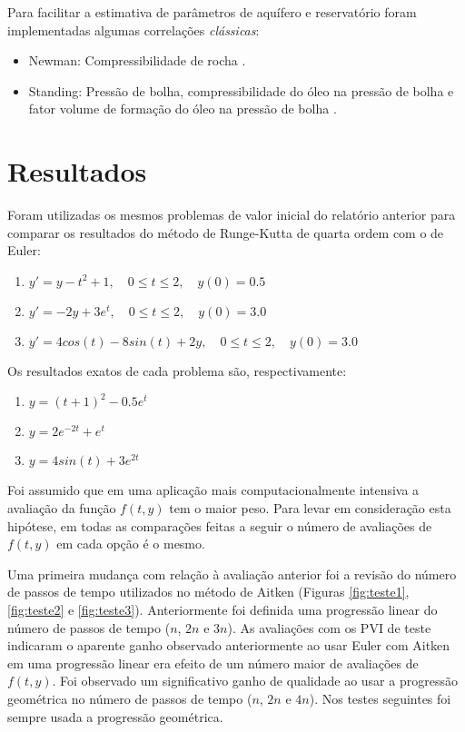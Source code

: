 \documentclass[final,5p]{elsarticle}
\numberwithin{equation}{section}
\begin{document}
        Para facilitar a estimativa de parâmetros de aquífero e reservatório foram implementadas algumas correlações \emph{clássicas}:

        \begin{itemize}
            \item Newman: Compressibilidade de rocha \cite{10.2118/3835-PA}.
            \item Standing: Pressão de bolha, compressibilidade do óleo na pressão de bolha e fator volume de formação do óleo na pressão de bolha \cite{standing1952volumetric}.
        \end{itemize}


\section{Resultados}

        Foram utilizadas os mesmos problemas de valor inicial do relatório anterior para comparar os resultados do método de Runge-Kutta de quarta ordem com o de Euler:

        \begin{enumerate}
            \item $y' = y - t^2 + 1, \quad 0 \leq t \leq  2, \quad y(0) = 0.5$ \label{item:pvi1}
            \item $y' = -2y + 3 e^t, \quad 0 \leq t \leq  2, \quad y(0) = 3.0$ \label{item:pvi2}
            \item $y' = 4 cos(t) - 8 sin(t) + 2 y, \quad 0 \leq t \leq  2, \quad y(0) = 3.0$ \label{item:pvi3}
        \end{enumerate}

        Os resultados exatos de cada problema são, respectivamente:

        \begin{enumerate}
            \item $y = (t+1)^2 - 0.5 e^t$
            \item $y = 2 e^{-2 t} + e^t$
            \item $y = 4 sin(t) + 3 e^{2 t}$
        \end{enumerate}

        Foi assumido que em uma aplicação mais computacionalmente intensiva a avaliação da função $f(t,y)$ tem o maior peso. Para levar em consideração esta hipótese, em todas as comparações feitas a seguir o número de avaliações de $f(t,y)$ em cada opção é o mesmo.

        Uma primeira mudança com relação à avaliação anterior foi a revisão do número de passos de tempo utilizados no método de Aitken (Figuras \ref{fig:teste1}, \ref{fig:teste2} e \ref{fig:teste3}). Anteriormente foi definida uma progressão linear do número de passos de tempo ($n$, $2 n$ e $3 n$). As avaliações com os PVI de teste indicaram o aparente ganho observado anteriormente ao usar Euler com Aitken em uma progressão linear era efeito de um número maior de avaliações de $f(t,y)$. Foi observado um significativo ganho de qualidade ao usar a progressão geométrica no número de passos de tempo ($n$, $2 n$ e $4 n$). Nos testes seguintes foi sempre usada a progressão geométrica.
\end{document}
